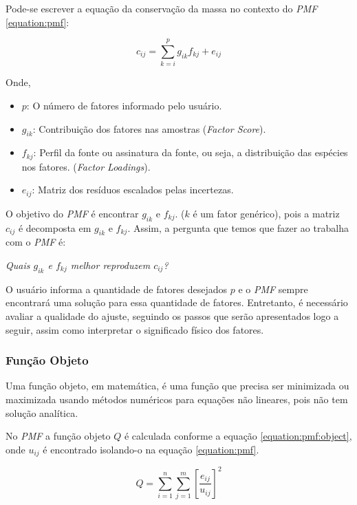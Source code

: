 Pode-se escrever a equação da conservação da massa no 
contexto do \textit{PMF} \ref{equation:pmf}: 

\begin{equation}
  c_{ij} = \sum_{k=i}^p g_{ik}f_{kj} + e_{ij}
  \label{equation:pmf}
\end{equation}

Onde,
\begin{itemize}
  \item $p$: O número de fatores informado pelo usuário.
  \item $g_{ik}$: Contribuição dos fatores nas amostras (\textit{Factor Score}).
  \item $f_{kj}$: Perfil da fonte ou assinatura da fonte, ou seja, 
        a distribuição das espécies nos fatores. (\textit{Factor Loadings}).
  \item $e_{ij}$: Matriz dos resíduos escalados pelas incertezas.
\end{itemize}

O objetivo do \textit{PMF} é encontrar $g_{ik}$ e $f_{kj}$. 
($k$ é um fator genérico), pois a matriz $c_{ij}$ é decomposta em 
$g_{ik}$ e $f_{kj}$. Assim, a pergunta que temos que fazer ao trabalha com 
o \textit{PMF} é: 

\textit{Quais $g_{ik}$ e $f_{kj}$ melhor reproduzem $c_{ij}$?}

O usuário informa a quantidade de fatores desejados $p$ e o \textit{PMF} 
sempre encontrará uma solução para essa quantidade de fatores. 
Entretanto, é necessário avaliar a qualidade do ajuste, seguindo os passos 
que serão apresentados logo a seguir, assim como interpretar o significado 
físico dos fatores. 

\subsubsection{Função Objeto}

Uma função objeto, em matemática, é uma função que precisa ser minimizada 
ou maximizada usando métodos numéricos para equações não lineares, pois não 
tem solução analítica. 

No \textit{PMF} a função objeto $Q$ é calculada conforme a equação 
\ref{equation:pmf:object}, onde ${u_{ij}}$ é encontrado isolando-o na 
equação \ref{equation:pmf}.

\begin{equation}
  Q = \sum_{i=1}^n \sum_{j=1}^m  \left[ \frac{e_{ij}} {u_{ij}} \right] ^2
  \label{equation:pmf:object}
\end{equation}

